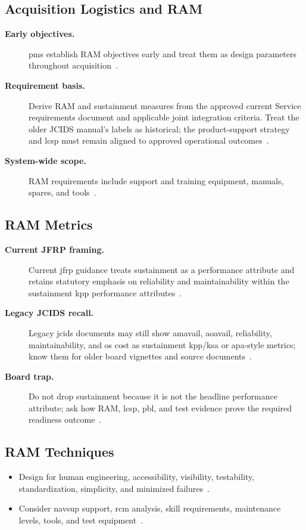 \documentclass[../main.tex]{subfiles}
\begin{document}
\subsection{Acquisition Logistics and RAM}
\begin{description}
  \item[\textbf{Early objectives.}] \acp{pm} establish RAM objectives early and treat them as design parameters throughout acquisition~\autocite{edo-3-5-4-acquisition-logistics-2025}.
  \item[\textbf{Requirement basis.}] Derive RAM and sustainment measures from the approved current Service requirements document and applicable joint integration criteria. Treat the older JCIDS manual's labels as historical; the product-support strategy and \ac{lcsp} must remain aligned to approved operational outcomes~\autocite{edo-3-3-3-jfrp-2026,DoDI5000-91}.
  \item[\textbf{System-wide scope.}] RAM requirements include support and training equipment, manuals, spares, and tools~\autocite{edo-3-5-4-acquisition-logistics-2025}.
\end{description}

\subsection{RAM Metrics}
\begin{description}
  \item[\textbf{Current JFRP framing.}] Current \ac{jfrp} guidance treats sustainment as a performance attribute and retains statutory emphasis on reliability and maintainability within the sustainment \ac{kpp} performance attributes~\autocite{CJCSM5123-01}.
  \item[\textbf{Legacy JCIDS recall.}] Legacy \ac{jcids} documents may still show \ac{amavail}, \ac{aoavail}, reliability, maintainability, and \ac{os} cost as sustainment \ac{kpp}/\ac{ksa} or \ac{apa}-style metrics; know them for older board vignettes and source documents~\autocite{edo-3-5-4-acquisition-logistics-2025,CJCSM5123-01}.
  \item[\textbf{Board trap.}] Do not drop sustainment because it is not the headline performance attribute; ask how RAM, \ac{lcsp}, \ac{pbl}, and test evidence prove the required readiness outcome~\autocite{CJCSM5123-01,DoDI5000-91}.
\end{description}

\subsection{RAM Techniques}
\begin{itemize}
  \item Design for human engineering, accessibility, visibility, testability, standardization, simplicity, and minimized failures~\autocite{edo-3-5-4-acquisition-logistics-2025}.
  \item Consider \ac{navsup} support, \ac{rcm} analysis, skill requirements, maintenance levels, tools, and test equipment~\autocite{edo-3-5-4-acquisition-logistics-2025}.
\end{itemize}
\end{document}
